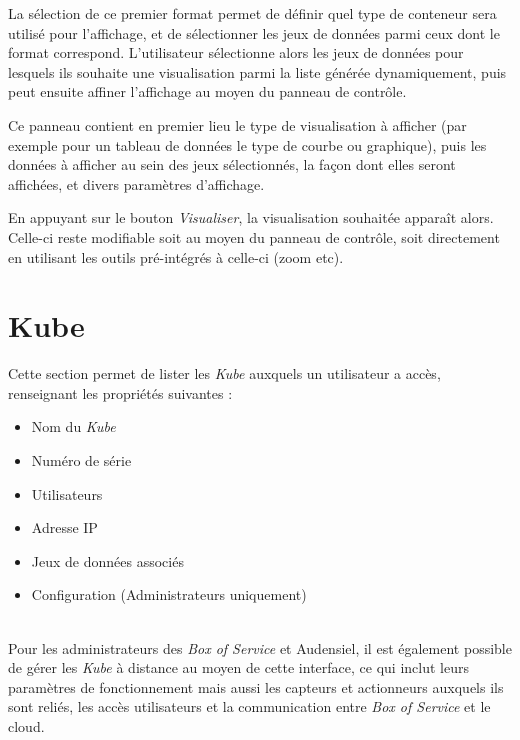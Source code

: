 \documentclass[a4paper]{report}
\begin{document}
La sélection de ce premier format permet de définir quel type de conteneur sera utilisé pour l'affichage, et de sélectionner les jeux de données parmi ceux dont le format correspond.
L'utilisateur sélectionne alors les jeux de données pour lesquels ils souhaite une visualisation parmi la liste générée dynamiquement, puis peut ensuite affiner l'affichage au moyen du panneau de contrôle.

Ce panneau contient en premier lieu le type de visualisation à afficher (par exemple pour un tableau de données le type de courbe ou graphique), puis les données à afficher au sein des jeux sélectionnés, la façon dont elles seront affichées, et divers paramètres d'affichage.

En appuyant sur le bouton \emph{Visualiser}, la visualisation souhaitée apparaît alors. Celle-ci reste modifiable soit au moyen du panneau de contrôle, soit directement en utilisant les outils pré-intégrés à celle-ci (zoom etc).
\newpage
\section{Kube}
\label{sec:kube}

Cette section permet de lister les \emph{Kube} auxquels un utilisateur a accès, renseignant les propriétés suivantes :

\begin{itemize}
	\item Nom du \emph{Kube}
	\item Numéro de série
	\item Utilisateurs
	\item Adresse IP
	\item Jeux de données associés
	\item Configuration (Administrateurs uniquement)
\end{itemize}
~\\
Pour les administrateurs des \emph{Box of Service} et Audensiel, il est également possible de gérer les \emph{Kube} à distance au moyen de cette interface, ce qui inclut leurs paramètres de fonctionnement mais aussi les capteurs et actionneurs auxquels ils sont reliés, les accès utilisateurs et la communication entre \emph{Box of Service} et le cloud.
\end{document}
